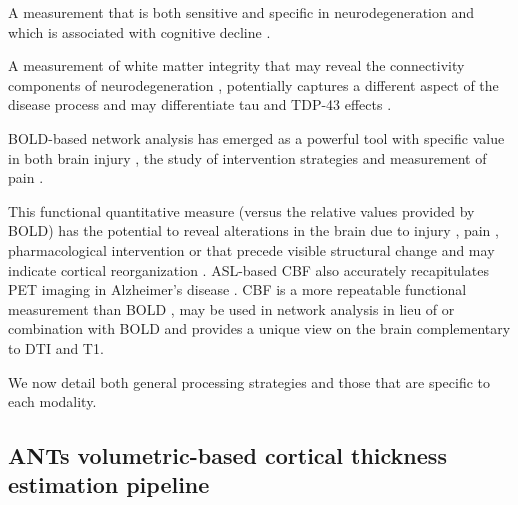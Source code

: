   A measurement that is both sensitive and specific in neurodegeneration \cite{Stricker2012,Libon2012,McMillan2013} and which is associated with cognitive decline \cite{Dickerson2011,Avants2010}.  

  A measurement of white matter integrity that may reveal the connectivity components of neurodegeneration \cite{Zhang2009}, potentially captures a different aspect of the disease process \cite{Englund2004} and may differentiate tau and TDP-43 effects \cite{McMillan2013b}.    

 BOLD-based network analysis
\cite{Spoormaker2010,Sanz-Arigita2010} has emerged as a powerful tool
with specific value in both brain injury
\cite{Mayer2011,Scheibel2012,Zhou2013}, the study of intervention
strategies \cite{Roy2010,FeldsteinEwing2011} and measurement of pain
\cite{Mayhew2013}.

  This functional
quantitative measure (versus the relative values provided by BOLD) has
the potential to reveal alterations in the brain due to injury
\cite{Kim2008}, pain \cite{Howard2011}, pharmacological intervention \cite{Black2010,Jenkins2012} or that precede visible structural change and may
indicate cortical reorganization \cite{Hayward2010}.  ASL-based CBF
also accurately recapitulates PET imaging in Alzheimer's disease \cite{Chen2011,Mak2012}.
CBF is a more repeatable functional measurement than BOLD
\cite{Liu2007,Aguirre2012}, may be used in network analysis in lieu of
or combination with 
BOLD \cite{Duda2013} and provides a unique view on the brain complementary to DTI and T1.  

We now detail both general processing strategies and those that are
specific to each modality.

\subsection{ANTs volumetric-based cortical thickness estimation pipeline}

